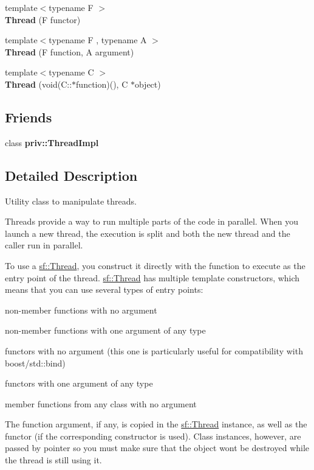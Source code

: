 \begin{DoxyCompactItemize}
\mbox{\label{classsf_1_1_thread_a00b88f036de66eb63765f4c12ceb6870}} 
{\footnotesize template$<$typename F $>$ }\\{\bfseries Thread} (F functor)
\item 
\mbox{\label{classsf_1_1_thread_a719b2cc067d92d52c35064a49d850a53}} 
{\footnotesize template$<$typename F , typename A $>$ }\\{\bfseries Thread} (F function, A argument)
\item 
\mbox{\label{classsf_1_1_thread_aa9f473c8cbb078900c62b1fd14a83a34}} 
{\footnotesize template$<$typename C $>$ }\\{\bfseries Thread} (void(C\+::$\ast$function)(), C $\ast$object)
\end{DoxyCompactItemize}
\subsection*{Friends}
\begin{DoxyCompactItemize}
\item 
\mbox{\label{classsf_1_1_thread_a5ed4f3acfcb44de47de196437c39f9ef}} 
class {\bfseries priv\+::\+Thread\+Impl}
\end{DoxyCompactItemize}


\subsection{Detailed Description}
Utility class to manipulate threads. 

Threads provide a way to run multiple parts of the code in parallel. When you launch a new thread, the execution is split and both the new thread and the caller run in parallel.

To use a \hyperlink{classsf_1_1_thread}{sf\+::\+Thread}, you construct it directly with the function to execute as the entry point of the thread. \hyperlink{classsf_1_1_thread}{sf\+::\+Thread} has multiple template constructors, which means that you can use several types of entry points\+: \begin{DoxyItemize}
\item non-\/member functions with no argument \item non-\/member functions with one argument of any type \item functors with no argument (this one is particularly useful for compatibility with boost/std\+:\+:bind) \item functors with one argument of any type \item member functions from any class with no argument\end{DoxyItemize}
The function argument, if any, is copied in the \hyperlink{classsf_1_1_thread}{sf\+::\+Thread} instance, as well as the functor (if the corresponding constructor is used). Class instances, however, are passed by pointer so you must make sure that the object won\textquotesingle{}t be destroyed while the thread is still using it.

